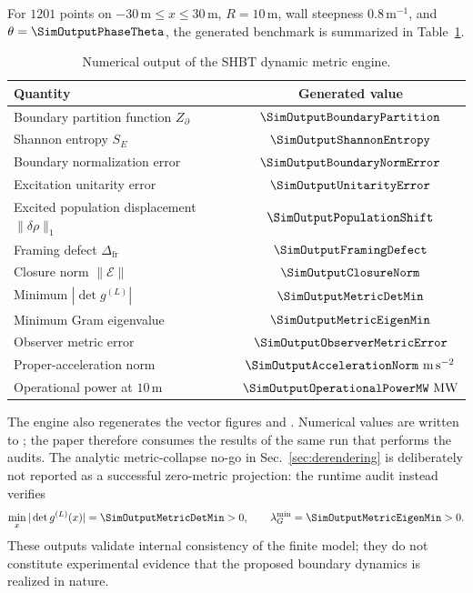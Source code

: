 For \(1201\) points on \(-30\,\mathrm{m}\leq x\leq30\,\mathrm{m}\),
\(R=10\,\mathrm{m}\), wall steepness
\(0.8\,\mathrm{m}^{-1}\), and
\(\theta=\SimOutputPhaseTheta\), the generated benchmark is summarized in
Table~\ref{tab:engine-benchmarks}.
\begin{table}[b]
  \centering
  \caption{Numerical output of the SHBT dynamic metric engine.}\label{tab:engine-benchmarks}
  \begin{tabular}{lc}
    \toprule
    \textbf{Quantity} & \textbf{Generated value} \\
    \midrule
    Boundary partition function \(Z_{\partial}\)
      & \(\SimOutputBoundaryPartition\) \\
    Shannon entropy \(S_E\)
      & \(\SimOutputShannonEntropy\) \\
    Boundary normalization error
      & \(\SimOutputBoundaryNormError\) \\
    Excitation unitarity error
      & \(\SimOutputUnitarityError\) \\
    Excited population displacement \(\|\delta\rho\|_1\)
      & \(\SimOutputPopulationShift\) \\
    Framing defect \(\Delta_{\mathrm{fr}}\)
      & \(\SimOutputFramingDefect\) \\
    Closure norm \(\|\mathcal E\|\)
      & \(\SimOutputClosureNorm\) \\
    Minimum \(|\det g^{(L)}|\)
      & \(\SimOutputMetricDetMin\) \\
    Minimum Gram eigenvalue
      & \(\SimOutputMetricEigenMin\) \\
    Observer metric error
      & \(\SimOutputObserverMetricError\) \\
    Proper-acceleration norm
      & \(\SimOutputAccelerationNorm\ \mathrm{m\,s^{-2}}\) \\
    Operational power at \(10\,\mathrm{m}\)
      & \(\SimOutputOperationalPowerMW\ \mathrm{MW}\) \\
    \bottomrule
  \end{tabular}
\end{table}

The engine also regenerates the vector figures
 and
.  Numerical values are written to
; the paper therefore consumes the results of the same
run that performs the audits.  The analytic metric-collapse no-go in
Sec.~\ref{sec:derendering} is deliberately not reported as a successful
zero-metric projection: the runtime audit instead verifies
\begin{equation}
  \min_x|\det g^{(L)}(x)|=\SimOutputMetricDetMin>0,
  \qquad
  \lambda_G^{\min}=\SimOutputMetricEigenMin>0.
  \label{eq:runtime-nonsingularity-result}
\end{equation}
These outputs validate internal consistency of the finite model; they do not
constitute experimental evidence that the proposed boundary dynamics is
realized in nature.

